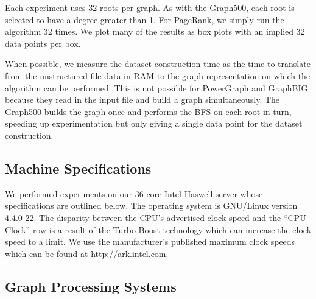 \documentclass{llncs}
\begin{document}
Each experiment uses 32 roots per graph. As with the Graph500, each root is selected to have a degree greater than 1. For PageRank, we simply run the algorithm 32 times. We plot many of the results as box plots with an implied 32 data points per box.

When possible, we measure the dataset construction time as the time to translate from the unstructured file data in RAM to the graph representation on which the algorithm can be performed. This is not possible for PowerGraph and GraphBIG because they read in the input file and build a graph simultaneously. The Graph500 builds the graph once and performs the BFS on each root in turn, speeding up experimentation but only giving a single data point for the dataset construction.

\subsection{Machine Specifications}
We performed experiments on our 36-core Intel Haswell server whose specifications are outlined below.
The operating system is GNU/Linux version 4.4.0-22. The disparity between the CPU's advertised clock speed and the ``CPU Clock'' row is a result of the Turbo Boost technology which can increase the clock speed to a limit. We use the manufacturer's published maximum clock speeds which can be found at \url{http://ark.intel.com}.
\begin{center}
\end{center}

\subsection{Graph Processing Systems}
\end{document}
